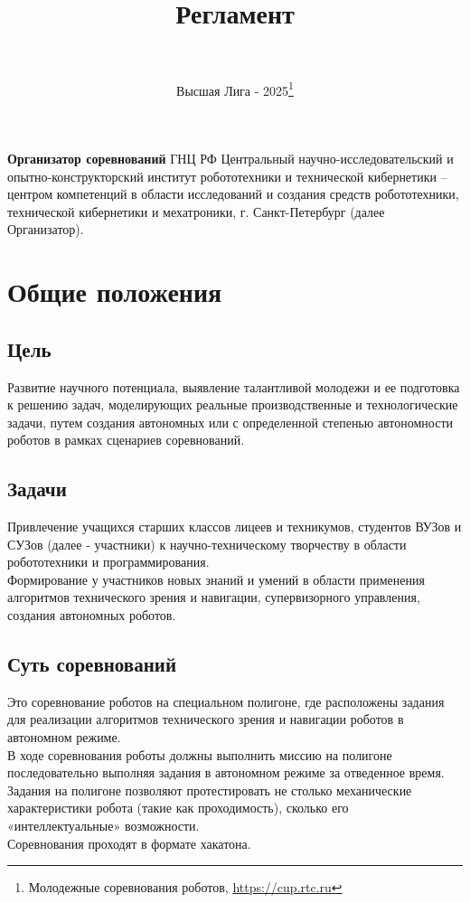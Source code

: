 \documentclass[12pt]{article}
\title{Регламент}
\date{Высшая Лига - 2025\footnote{Молодежные соревнования роботов, \href{https://cup.rtc.ru}{https://cup.rtc.ru}}}
\author{\courselong\\\currentdate}
\begin{document}
\maketitle \hspace*{0.5cm} 
\textbf{Организатор соревнований} ГНЦ РФ Центральный научно-исследовательский и опытно-конструкторский институт робототехники и технической кибернетики – центром компетенций в области исследований и создания средств робототехники, технической кибернетики и мехатроники, г. Санкт-Петербург (далее Организатор).
\newpage
\section{Общие положения}
\label{sec:intro}

\subsection{Цель} \hspace*{1cm}
Развитие научного потенциала, выявление талантливой молодежи и ее подготовка к решению задач, моделирующих реальные производственные и технологические задачи, путем создания автономных или с определенной степенью автономности роботов в рамках сценариев соревнований.

\subsection{Задачи} \hspace*{1cm}
Привлечение учащихся старших классов лицеев и техникумов, студентов ВУЗов и СУЗов (далее - участники) к научно-техническому творчеству в области робототехники и программирования.
\\\hspace*{1cm}
Формирование у участников новых знаний и умений в области применения алгоритмов технического зрения и навигации, супервизорного управления, создания автономных роботов.

\subsection{Суть соревнований} \hspace*{1cm}
Это соревнование роботов на специальном полигоне, где расположены задания для реализации алгоритмов технического зрения и навигации роботов в автономном режиме.
\\\hspace*{1cm}
В ходе соревнования роботы должны выполнить миссию на полигоне последовательно выполняя задания в автономном режиме за отведенное время.
\\\hspace*{1cm}
Задания на полигоне позволяют протестировать не столько механические характеристики робота (такие как проходимость), сколько его «интеллектуальные» возможности.
\\\hspace*{1cm}
Соревнования проходят в формате хакатона.
\end{document}
